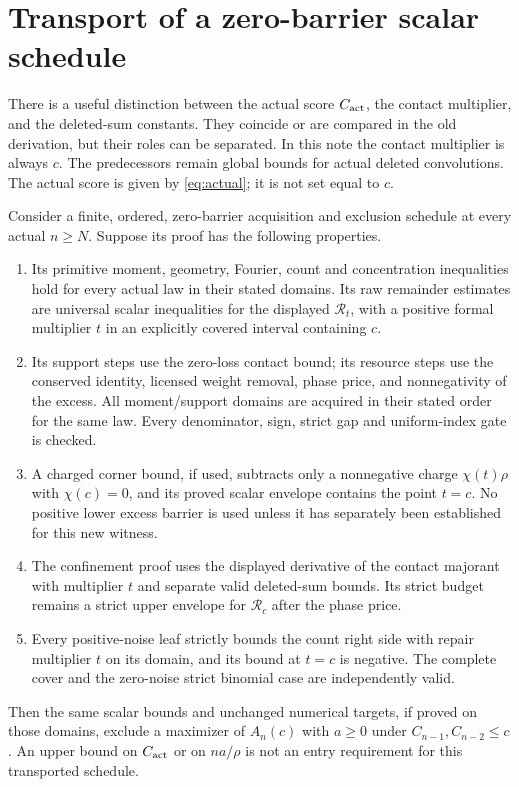 \section{Transport of a zero-barrier scalar schedule}
There is a useful distinction between the actual score $C_{\rm act}$,
the contact multiplier, and the deleted-sum constants. They coincide or
are compared in the old derivation, but their roles can be separated.
In this note the contact multiplier is always $c$. The predecessors
remain global bounds for actual deleted convolutions. The actual score
is given by \eqref{eq:actual}; it is not set equal to $c$.

\begin{theorem}\label{thm:transport}
Consider a finite, ordered, zero-barrier acquisition and exclusion
schedule at every actual $n\ge N$. Suppose its proof has the following
properties.
\begin{enumerate}
\item Its primitive moment, geometry, Fourier, count and concentration
inequalities hold for every actual law in their stated domains. Its raw
remainder estimates are universal scalar inequalities for the displayed
$\mathscr R_t$, with a positive formal multiplier $t$ in an explicitly
covered interval containing $c$.
\item Its support steps use the zero-loss contact bound; its resource
steps use the conserved identity, licensed weight removal, phase price,
and nonnegativity of the excess. All moment/support domains are acquired
in their stated order for the same law. Every denominator, sign, strict
gap and uniform-index gate is checked.
\item A charged corner bound, if used, subtracts only a nonnegative
charge $\chi(t)\rho$ with $\chi(c)=0$, and its proved scalar envelope
contains the point $t=c$. No positive lower excess barrier is used unless
it has separately been established for this new witness.
\item The confinement proof uses the displayed derivative of the contact
majorant with multiplier $t$ and separate valid deleted-sum bounds. Its
strict budget remains a strict upper envelope for $\mathscr R_c$ after
the phase price.
\item Every positive-noise leaf strictly bounds the count right side
with repair multiplier $t$ on its domain, and its bound at $t=c$ is
negative. The complete cover and the zero-noise strict binomial case
are independently valid.
\end{enumerate}
Then the same scalar bounds and unchanged numerical targets, if proved
on those domains, exclude a maximizer of $A_n(c)$ with $a\ge0$ under
$C_{n-1},C_{n-2}\le c$. An upper bound on $C_{\rm act}$ or on $na/\rho$
is not an entry requirement for this transported schedule.
\end{theorem}
